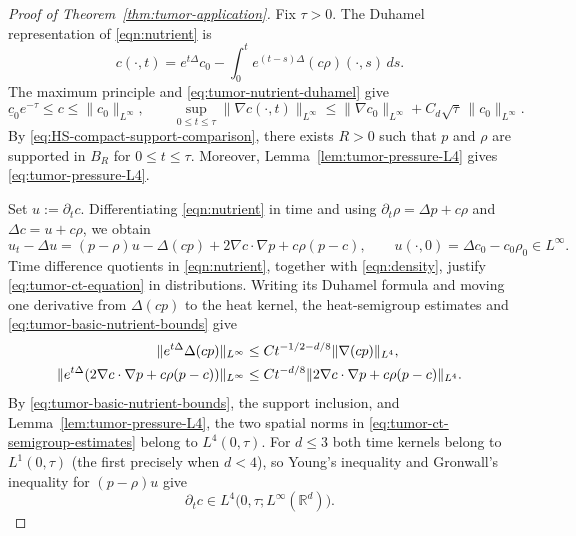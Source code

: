 \documentclass[11pt]{amsart}
\numberwithin{equation}{section}
\numberwithin{figure}{section}
\theoremstyle{plain}
\theoremstyle{definition}
\theoremstyle{remark}
\theoremstyle{plain}
\def\R{\mathbb{R}}
\begin{document}
\begin{proof}[Proof of Theorem~\ref{thm:tumor-application}]
Fix $\tau>0$. The Duhamel representation of \eqref{eqn:nutrient} is
\begin{equation}\label{eq:tumor-nutrient-duhamel}
 c(\cdot,t)=e^{t\Delta}c_0
 -\int_0^t e^{(t-s)\Delta}(c\rho)(\cdot,s)\,ds.
\end{equation}
The maximum principle and \eqref{eq:tumor-nutrient-duhamel} give
\begin{equation}\label{eq:tumor-basic-nutrient-bounds}
 \underline c_0e^{-\tau}\leq c\leq\|c_0\|_{L^\infty},
 \qquad
 \sup_{0\leq t\leq\tau}\|\nabla c(\cdot,t)\|_{L^\infty}
 \leq \|\nabla c_0\|_{L^\infty}
      +C_d\sqrt{\tau}\,\|c_0\|_{L^\infty}.
\end{equation}
By \eqref{eq:HS-compact-support-comparison}, there  exists $R>0$ such that $p$ and
$\rho$ are supported in $B_R$ for $0\leq t\leq\tau$.  Moreover,
Lemma~\ref{lem:tumor-pressure-L4} gives \eqref{eq:tumor-pressure-L4}.

Set $u:=\partial_t c$.  Differentiating \eqref{eqn:nutrient} in time and using
$\partial_t\rho=\Delta p+c\rho$ and $\Delta c=u+c\rho$, we obtain
\begin{equation}\label{eq:tumor-ct-equation}
 u_t-\Delta u=(p-\rho)u-\Delta(cp)
       +2\nabla c\cdot\nabla p+c\rho(p-c),
 \qquad u(\cdot,0)=\Delta c_0-c_0\rho_0\in L^\infty.
\end{equation}
Time difference quotients in \eqref{eqn:nutrient}, together with
\eqref{eqn:density}, justify \eqref{eq:tumor-ct-equation} in distributions.
Writing its Duhamel formula and moving one derivative from $\Delta(cp)$ to the
heat kernel, the heat-semigroup estimates and
\eqref{eq:tumor-basic-nutrient-bounds} give
\begin{align}
 \|e^{t\Delta}\Delta(cp)\|_{L^\infty}
 &\leq Ct^{-1/2-d/8}\|\nabla(cp)\|_{L^4},\notag\\
 \|e^{t\Delta}(2\nabla c\cdot\nabla p+c\rho(p-c))\|_{L^\infty}
 &\leq Ct^{-d/8}
 \|2\nabla c\cdot\nabla p+c\rho(p-c)\|_{L^4}.
 \label{eq:tumor-ct-semigroup-estimates}
\end{align}
By \eqref{eq:tumor-basic-nutrient-bounds}, the support inclusion, and
Lemma~\ref{lem:tumor-pressure-L4}, the two spatial norms in
\eqref{eq:tumor-ct-semigroup-estimates} belong to $L^4(0,\tau)$. For $d\leq3$
both time kernels belong to $L^1(0,\tau)$ (the first precisely when $d<4$), so
Young's inequality and Gronwall's inequality for $(p-\rho)u$ give
\begin{equation}\label{eq:tumor-ct-L4-Linfty}
    \partial_t c\in L^4\bigl(0,\tau;L^\infty(\R^d)\bigr).
\end{equation}


\end{proof}
\end{document}
